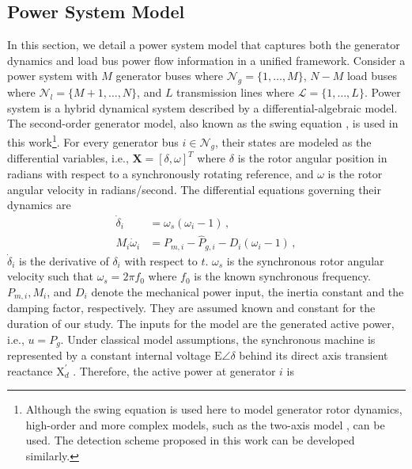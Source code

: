\subsection{Power System Model}
\label{sec:power_model}
In this section, we detail a power system model that captures both the generator dynamics and load bus power flow information in a unified framework. Consider a power system with $M$ generator buses where $\mathcal{N}_g = \{1, \dots, M\}$, $N-M$ load buses where $\mathcal{N}_l = \{M+1, \dots, N\}$, and $L$ transmission lines where $\mathcal{L} = \{1, \dots, L\}$. 
Power system is a hybrid dynamical system described by a differential-algebraic model. The second-order generator model, also known as the swing equation \cite{Kundur1994}, is used in this work\footnote{Although the swing equation is used here to model generator rotor dynamics, high-order and more complex models, such as the two-axis model \cite{sauer2017power}, can be used. The detection scheme proposed in this work can be developed similarly.}.
For every generator bus $i \in \mathcal{N}_g$, their states are modeled as the differential variables, i.e., $\boldsymbol{X}= [\delta, \omega]^T$ where $\delta$ is the rotor angular position in radians with respect to a synchronously rotating reference, and $\omega$ is the rotor angular velocity in radians/second. The differential equations governing their dynamics are
\begin{subequations}
\label{eqn:de_continuous}
\begin{align}
\dot{\delta}_{i} &=\omega_s\left(\omega_{i}-1\right) \,, \label{eqn:transition_function_delta}\\
M_i \dot{\omega}_{i} &=P_{m, i}-\hat{P}_{g, i}-D_i\left(\omega_{i}-1\right) \,, \label{eqn:transition_function_omega}
\end{align}
\end{subequations}
$\dot{\delta}_{i}$ is the derivative of $\delta_i$ with respect to $t$. $\omega_s$ is the synchronous rotor angular velocity such that $\omega_s= 2 \pi f_{0}$ where $f_0$ is the known synchronous frequency. $P_{m,i}, M_i$, and $D_i$ denote the mechanical power input, the inertia constant and the damping factor, respectively. They are assumed known and constant for the duration of our study. The inputs for the model are the generated active power, i.e., ${u}= P_{g}$. Under classical model assumptions, the synchronous machine is represented by a constant internal voltage $\text{E}\angle\delta$ behind its direct axis transient reactance $\text{X}_{{d}}^{\prime}$ \cite{Kundur1994}. Therefore, the active power at generator $i$ is
